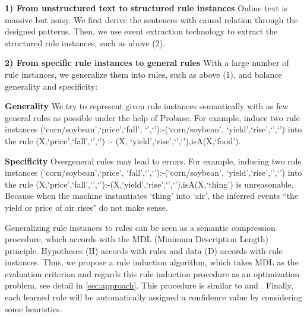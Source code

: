 \textbf{1) From unstructured text to structured rule instances} Online text is massive but noisy. We first derive the sentences with causal relation through the designed patterns. Then, we use event extraction technology to extract the structured rule instances, such as above (2).
	
\textbf{2) From specific rule instances to general rules} With a large number of rule instances, we generalize them into rules, such as above (1), and balance generality and specificity:
	
\textbf{Generality} We try to represent given rule instances semantically with as few general rules as possible under the help of Probase\cite{Wu2012a}. For example, induce two rule instances (`corn/soybean',`price',`fall', `',`'):-(`corn/soybean', `yield',`rise',`',`') into the rule (X,`price',`fall',`',`') :- (X, `yield',`rise',`',`'),isA(X,`food').


\textbf{Specificity} Overgeneral rules may lead to errors. For example,
inducing two rule instances (`corn/soybean',`price', `fall',`',`'):-(`corn/soybean', `yield',`rise',`',`') into the rule (X,`price',`fall',`',`'):-(X,`yield',`rise',`',`'),isA(X,`thing') is unreasonable. Because when the machine instantiates `thing' into `air', the inferred events ``the yield or price of air rises" do not make sense.

Generalizing rule instances to rules can be seen as a semantic compression procedure, which accords with the MDL (Minimum Description Length) principle. Hypotheses (H) accords with rules and data (D) accords with rule instances. Thus, we propose a rule induction algorithm, which takes MDL as the evaluation criterion and regards this rule induction procedure as an optimization problem, see detail in \ref{sec:approach}. This procedure is similar to \cite{Cui2016} and \cite{Zhu}. Finally, each learned rule will be automatically assigned a confidence value by considering some heuristics.
	

	
